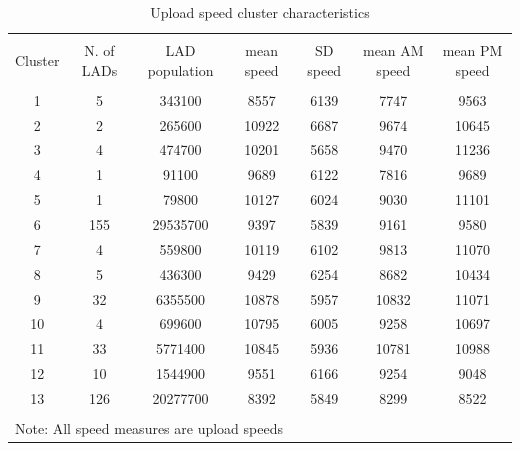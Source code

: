 \documentclass[]{interact}
\theoremstyle{plain}%
\theoremstyle{definition}
\theoremstyle{remark}
\begin{document}
\begin{table}[!htbp] \centering 
  \caption{Upload speed cluster characteristics\label{up.cluster.descr}} 
  \label{} 
\footnotesize 
\begin{tabular}{@{\extracolsep{0pt}} ccccccc} 
\\[-1.8ex]\hline 
\hline \\[-1.8ex] 
Cluster & N. of LADs & LAD population & mean speed & SD speed & mean AM speed & mean PM speed \\ 
\hline \\[-1.8ex] 
1 & 5 & 343100 & 8557 & 6139 & 7747 & 9563 \\ 
2 & 2 & 265600 & 10922 & 6687 & 9674 & 10645 \\ 
3 & 4 & 474700 & 10201 & 5658 & 9470 & 11236 \\ 
4 & 1 & 91100 & 9689 & 6122 & 7816 & 9689 \\ 
5 & 1 & 79800 & 10127 & 6024 & 9030 & 11101 \\ 
6 & 155 & 29535700 & 9397 & 5839 & 9161 & 9580 \\ 
7 & 4 & 559800 & 10119 & 6102 & 9813 & 11070 \\ 
8 & 5 & 436300 & 9429 & 6254 & 8682 & 10434 \\ 
9 & 32 & 6355500 & 10878 & 5957 & 10832 & 11071 \\ 
10 & 4 & 699600 & 10795 & 6005 & 9258 & 10697 \\ 
11 & 33 & 5771400 & 10845 & 5936 & 10781 & 10988 \\ 
12 & 10 & 1544900 & 9551 & 6166 & 9254 & 9048 \\ 
13 & 126 & 20277700 & 8392 & 5849 & 8299 & 8522 \\ 
\hline \\[-1.8ex] 
\multicolumn{7}{l}{Note: All speed measures are upload speeds} \\ 
\end{tabular} 
\end{table}
\end{document}
